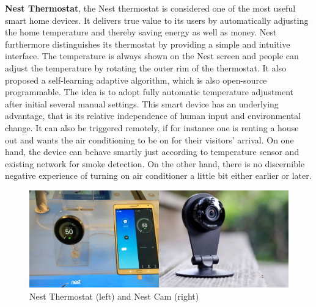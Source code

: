 \textbf{Nest Thermostat}, the Nest thermostat is considered one of the most useful smart home devices. It delivers true value to its users by automatically adjusting the home temperature and thereby saving energy as well as money.
Nest furthermore distinguishes its thermostat by providing a simple and intuitive interface.
The temperature is always shown on the Nest screen and people can adjust the temperature by rotating the outer rim of the thermostat. It also proposed a self-learning adaptive algorithm, which is also open-source programmable. The idea is to adopt fully automatic temperature adjustment after initial several manual settings. This smart device has an underlying advantage, that is its relative independence of human input and environmental change. It can also be triggered remotely, if for instance one is renting a house out and wants the air conditioning to be on for their visitors' arrival. On one hand, the device can behave smartly just according to temperature sensor and existing network for smoke detection. On the other hand, there is no discernible negative experience of turning on air conditioner a little bit either earlier or later.  

\begin{figure}[ht]
	\centering
    \includegraphics[width=\textwidth]{Figures/BenchmarkingOld/Nest_Products.jpg}
	\caption{Nest Thermostat (left) and Nest Cam (right)}
	\label{fig:Nest_Products}
\end{figure}

